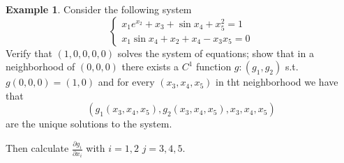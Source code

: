 \documentclass[11pt,openany]{book}
\theoremstyle{plain}
\theoremstyle{definition}
\newtheorem{example}{Example}[chapter]
\theoremstyle{remark}
\begin{document}
\begin{example}
    Consider the following system 
    $$\begin{cases}
        x_1 e^{x_2} + x_3 + \sin x_4 + x_5^2 = 1\\
        x_1 \sin x_4 + x_2 + x_4 - x_3 x_5 = 0
    \end{cases}$$
    Verify that $(1, 0,0,0,0)$ solves the system of equations; show that in a neighborhood of $(0,0,0)$ there exists a 
    $C^1$ function $g \colon (g_1, g_2)$ s.t. $g(0,0,0) = (1,0)$ and for every $(x_3, x_4, x_5)$ in tht neighborhood we have that 
    $$(g_1(x_3, x_4, x_5), g_2(x_3, x_4, x_5), x_3, x_4, x_5)$$
    are the unique solutions to the system. 

    Then calculate $\frac{\partial g_i}{\partial x_i}$ with $i = 1,2$ $j = 3,4,5$.


\end{example}
\end{document}
